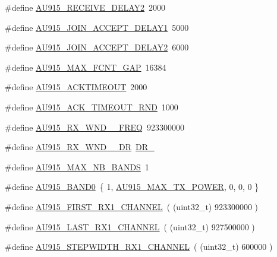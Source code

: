 \begin{DoxyCompactItemize}
\#define \mbox{\hyperlink{group___r_e_g_i_o_n_a_u915_ga06692cedba60898ee0df93cf21429796}{A\+U915\+\_\+\+R\+E\+C\+E\+I\+V\+E\+\_\+\+D\+E\+L\+A\+Y2}}~2000
\item 
\#define \mbox{\hyperlink{group___r_e_g_i_o_n_a_u915_ga6a3867937f85eac03a4f5518fddee947}{A\+U915\+\_\+\+J\+O\+I\+N\+\_\+\+A\+C\+C\+E\+P\+T\+\_\+\+D\+E\+L\+A\+Y1}}~5000
\item 
\#define \mbox{\hyperlink{group___r_e_g_i_o_n_a_u915_ga00b42a4ecd7b4484f73a1e428652f5fc}{A\+U915\+\_\+\+J\+O\+I\+N\+\_\+\+A\+C\+C\+E\+P\+T\+\_\+\+D\+E\+L\+A\+Y2}}~6000
\item 
\#define \mbox{\hyperlink{group___r_e_g_i_o_n_a_u915_gaf4dd6f2ba296be813e56ffc3fdcbf7ab}{A\+U915\+\_\+\+M\+A\+X\+\_\+\+F\+C\+N\+T\+\_\+\+G\+AP}}~16384
\item 
\#define \mbox{\hyperlink{group___r_e_g_i_o_n_a_u915_ga3fc2d9d63bcd48b926612b12eaa81971}{A\+U915\+\_\+\+A\+C\+K\+T\+I\+M\+E\+O\+UT}}~2000
\item 
\#define \mbox{\hyperlink{group___r_e_g_i_o_n_a_u915_ga093d31ebddca807195cbe6c6144258fa}{A\+U915\+\_\+\+A\+C\+K\+\_\+\+T\+I\+M\+E\+O\+U\+T\+\_\+\+R\+ND}}~1000
\item 
\#define \mbox{\hyperlink{group___r_e_g_i_o_n_a_u915_ga0fbc056b672f0dedf7311ddfe59515b6}{A\+U915\+\_\+\+R\+X\+\_\+\+W\+N\+D\+\_\+\_\+\+F\+R\+EQ}}~923300000
\item 
\#define \mbox{\hyperlink{group___r_e_g_i_o_n_a_u915_gab50b9056c8405c3538819bbc21b78ebf}{A\+U915\+\_\+\+R\+X\+\_\+\+W\+N\+D\+\_\+\_\+\+DR}}~\mbox{\hyperlink{group___r_e_g_i_o_n_ga44cc96ba80ae464cd9330b784d329c16}{D\+R\+\_}}
\item 
\#define \mbox{\hyperlink{group___r_e_g_i_o_n_a_u915_gad166b707f964b6b057ec3bb189c35ebc}{A\+U915\+\_\+\+M\+A\+X\+\_\+\+N\+B\+\_\+\+B\+A\+N\+DS}}~1
\item 
\#define \mbox{\hyperlink{group___r_e_g_i_o_n_a_u915_ga6e0a29afe59acad8c0b01808e984684a}{A\+U915\+\_\+\+B\+A\+N\+D0}}~\{ 1, \mbox{\hyperlink{group___r_e_g_i_o_n_a_u915_ga36808f695e52582b8a6a3ca4b4bf61d4}{A\+U915\+\_\+\+M\+A\+X\+\_\+\+T\+X\+\_\+\+P\+O\+W\+ER}}, 0, 0, 0 \}
\item 
\#define \mbox{\hyperlink{group___r_e_g_i_o_n_a_u915_ga006dab0130b61538f621e80e9f6028ce}{A\+U915\+\_\+\+F\+I\+R\+S\+T\+\_\+\+R\+X1\+\_\+\+C\+H\+A\+N\+N\+EL}}~( (uint32\+\_\+t) 923300000 )
\item 
\#define \mbox{\hyperlink{group___r_e_g_i_o_n_a_u915_gaa9d052a49ace8fc23a34e297449711be}{A\+U915\+\_\+\+L\+A\+S\+T\+\_\+\+R\+X1\+\_\+\+C\+H\+A\+N\+N\+EL}}~( (uint32\+\_\+t) 927500000 )
\item 
\#define \mbox{\hyperlink{group___r_e_g_i_o_n_a_u915_gae66b13ecda158ed17cddb4ca5a9331f5}{A\+U915\+\_\+\+S\+T\+E\+P\+W\+I\+D\+T\+H\+\_\+\+R\+X1\+\_\+\+C\+H\+A\+N\+N\+EL}}~( (uint32\+\_\+t) 600000 )
\end{DoxyCompactItemize}
